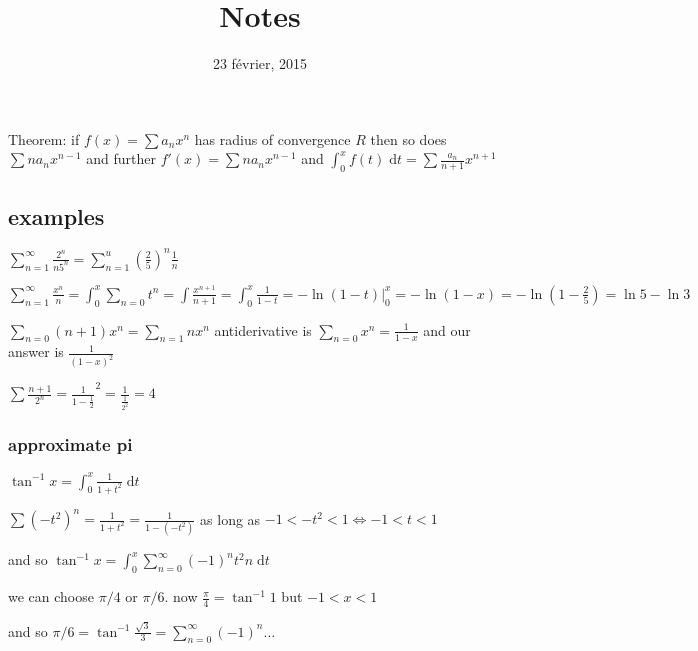\documentclass[letterpaper]{article}
\begin{document}
\title{Notes}
\date{23 février, 2015}
\maketitle
Theorem: if $f(x)=\sum\limits{a_nx^n}$ has radius of convergence $R$ then so does $\sum\limits{na_nx^{n-1}}$ and further $f'(x)=\sum\limits{na_nx^{n-1}}$ and $\int_0^x{f(t)\;\mathrm{d}t}=\sum\limits{\frac{a_n}{n+1}x^{n+1}}$

\subsection*{examples}
$\sum\limits_{n=1}^\infty{\frac{2^n}{n5^n}}=\sum\limits_{n=1}^u{\left(\frac{2}{5}\right)^n\frac{1}{n}}$

$\sum\limits_{n=1}^\infty{\frac{x^n}{n}}=\int_{0}^x{\sum\limits_{n=0}{t^n}}=\int{\frac{x^{n+1}}{n+1}}=\int_0^x{\frac{1}{1-t}}=-\ln(1-t)|_0^x=-\ln(1-x)=-\ln(1-\frac{2}{5})=\ln 5-\ln 3$

$\sum\limits_{n=0}{(n+1)x^n}=\sum\limits_{n=1}{nx^n}$
antiderivative is $\sum\limits_{n=0}{x^n}=\frac{1}{1-x}$ and our answer is $\frac{1}{(1-x)^2}$

$\sum\limits{\frac{n+1}{2^n}}=\frac{1}{1-\frac{1}{2}}^2=\frac{1}{\frac{1}{2^2}}=4$

\subsubsection*{approximate pi}
$\tan^{-1} x=\int_0^x{\frac{1}{1+t^2}\;\mathrm{d}t}$

$\sum\limits{(-t^2)^n}=\frac{1}{1+t^2}=\frac{1}{1-(-t^2)}$ as long as $-1<-t^2<1\Leftrightarrow-1<t<1$

and so $\tan^{-1} x=\int_0^x{\sum\limits_{n=0}^\infty{(-1)^nt^2n}\;\mathrm{d}t}$

we can choose $\pi/4$ or $\pi/6$. now $\frac{\pi}{4}=\tan^{-1}1$ but $-1<x<1$

and so $\pi/6=\tan^{-1}\frac{\sqrt{3}}{3}=\sum\limits_{n=0}^\infty{(-1)^n\dots}$
\end{document}
